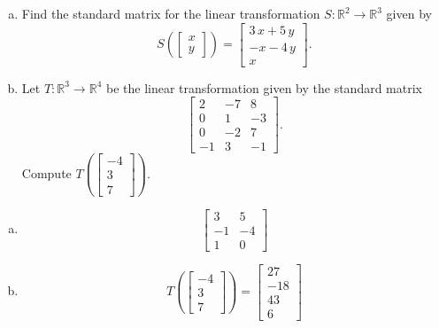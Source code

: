 
\begin{exerciseStatement}

\begin{enumerate}[(a)]
\item Find the standard matrix for the linear transformation \(S:\mathbb{R}^ 2  \to \mathbb{R}^ 3 \) given by \[S\left(  \left[\begin{array}{c}
x \\
y
\end{array}\right]  \right) =  \left[\begin{array}{c}
3 \, x + 5 \, y \\
-x - 4 \, y \\
x
\end{array}\right] .\]
\item Let \(T:\mathbb{R}^ 3  \to \mathbb{R}^ 4 \) be the linear transformation given by the standard matrix \[ \left[\begin{array}{ccc}
2 & -7 & 8 \\
0 & 1 & -3 \\
0 & -2 & 7 \\
-1 & 3 & -1
\end{array}\right] .\] Compute \(T\left( \left[\begin{array}{c}
-4 \\
3 \\
7
\end{array}\right]  \right)\). 
\end{enumerate}
    
\end{exerciseStatement}
    
\begin{exerciseAnswer} 

\begin{enumerate}[(a)]
\item \[ \left[\begin{array}{cc}
3 & 5 \\
-1 & -4 \\
1 & 0
\end{array}\right] \]
\item \[T\left( \left[\begin{array}{c}
-4 \\
3 \\
7
\end{array}\right]  \right)= \left[\begin{array}{c}
27 \\
-18 \\
43 \\
6
\end{array}\right] \]
\end{enumerate}
    
\end{exerciseAnswer}
    
